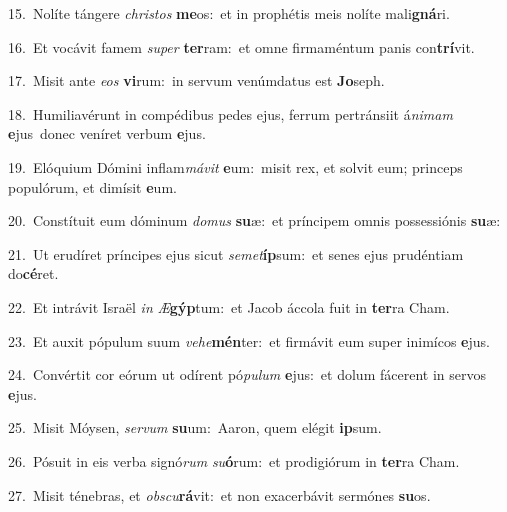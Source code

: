 {\numbfont\textcolor{\numbcolor}{15.}}~Nolíte tángere \textit{chris}\-\textit{tos} \textbf{me}\-os:~\star et in prophétis meis nolíte mali\-\textbf{gná}\-ri.\par
{\numbfont\textcolor{\numbcolor}{16.}}~Et vocávit famem \textit{su}\-\textit{per} \textbf{ter}\-ram:~\star et omne firmaméntum panis con\-\textbf{trí}\-vit.\par
{\numbfont\textcolor{\numbcolor}{17.}}~Misit ante \textit{e}\-\textit{os} \textbf{vi}\-rum:~\star in servum venúmdatus est \textbf{Jo}\-seph.\par
{\numbfont\textcolor{\numbcolor}{18.}}~Humiliavérunt in compédibus pedes ejus, ferrum pertránsiit á\-\textit{ni}\-\textit{mam} \textbf{e}\-jus~\star donec veníret verbum \textbf{e}\-jus.\par
{\numbfont\textcolor{\numbcolor}{19.}}~Elóquium Dómini inflam\-\textit{má}\-\textit{vit} \textbf{e}\-um:~\star misit rex, et solvit eum; princeps populórum, et dimísit \textbf{e}\-um.\par
{\numbfont\textcolor{\numbcolor}{20.}}~Constítuit eum dóminum \textit{do}\-\textit{mus} \textbf{su}\-æ:~\star et príncipem omnis possessiónis \textbf{su}\-æ:\par
{\numbfont\textcolor{\numbcolor}{21.}}~Ut erudíret príncipes ejus sicut \textit{se}\-\textit{met}\textbf{íp}sum:~\star et senes ejus prudéntiam do\-\textbf{cé}\-ret.\par
{\numbfont\textcolor{\numbcolor}{22.}}~Et intrávit Israël \textit{in} \textit{Æ}\-\textbf{gýp}tum:~\star et Jacob áccola fuit in \textbf{ter}\-ra Cham.\par
{\numbfont\textcolor{\numbcolor}{23.}}~Et auxit pópulum suum \textit{ve}\-\textit{he}\textbf{mén}ter:~\star et firmávit eum super inimícos \textbf{e}\-jus.\par
{\numbfont\textcolor{\numbcolor}{24.}}~Convértit cor eórum ut odírent pó\-\textit{pu}\-\textit{lum} \textbf{e}\-jus:~\star et dolum fácerent in servos \textbf{e}\-jus.\par
{\numbfont\textcolor{\numbcolor}{25.}}~Misit Móysen, \textit{ser}\-\textit{vum} \textbf{su}\-um:~\star Aaron, quem elégit \textbf{ip}\-sum.\par
{\numbfont\textcolor{\numbcolor}{26.}}~Pósuit in eis verba signó\textit{rum} \textit{su}\-\textbf{ó}rum:~\star et prodigiórum in \textbf{ter}\-ra Cham.\par
{\numbfont\textcolor{\numbcolor}{27.}}~Misit ténebras, et \textit{obs}\-\textit{cu}\textbf{rá}vit:~\star et non exacerbávit sermónes \textbf{su}\-os.\par
